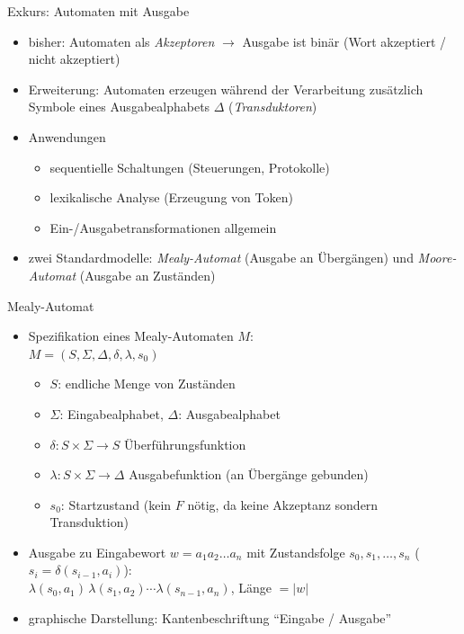 \begin{frame}{Exkurs: Automaten mit Ausgabe}
	\begin{itemize}
		\item bisher: Automaten als \emph{Akzeptoren} $\rightarrow$ Ausgabe ist binär (Wort akzeptiert / nicht akzeptiert)
		\item Erweiterung: Automaten erzeugen während der Verarbeitung zusätzlich Symbole eines Ausgabealphabets $\Delta$ (\emph{Transduktoren})
		\item Anwendungen
		\begin{itemize}
			\item sequentielle Schaltungen (Steuerungen, Protokolle)
			\item lexikalische Analyse (Erzeugung von Token)
			\item Ein-/Ausgabetransformationen allgemein
		\end{itemize}
		\item zwei Standardmodelle: \emph{Mealy-Automat} (Ausgabe an Übergängen) und \emph{Moore-Automat} (Ausgabe an Zuständen)
	\end{itemize}
\end{frame}

\begin{frame}{Mealy-Automat}
	\begin{itemize}
		\item Spezifikation eines Mealy-Automaten $M$:\\
		$M=\left(S, \Sigma, \Delta, \delta, \lambda, s_0\right)$
		\begin{itemize}
			\item $S$: endliche Menge von Zuständen
			\item $\Sigma$: Eingabealphabet, $\Delta$: Ausgabealphabet
			\item $\delta:S \times \Sigma \rightarrow S$ Überführungsfunktion
			\item $\lambda:S \times \Sigma \rightarrow \Delta$ Ausgabefunktion (an Übergänge gebunden)
			\item $s_0$: Startzustand (kein $F$ nötig, da keine Akzeptanz sondern Transduktion)
		\end{itemize}
		\item Ausgabe zu Eingabewort $w=a_1a_2\ldots a_n$ mit Zustandsfolge $s_0,s_1,\ldots,s_n$ ($s_i=\delta(s_{i-1},a_i)$):\\
		\quad $\lambda(s_0,a_1)\,\lambda(s_1,a_2)\cdots\lambda(s_{n-1},a_n)$, \quad Länge $=|w|$
		\item graphische Darstellung: Kantenbeschriftung "`Eingabe / Ausgabe"'
	\end{itemize}
\end{frame}

